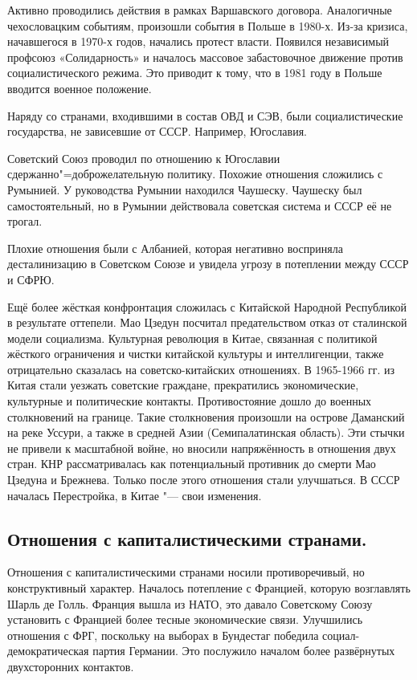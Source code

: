     Активно проводились действия в рамках Варшавского договора. Аналогичные чехословацким событиям, произошли события в Польше в 1980-х. Из-за кризиса, начавшегося в 1970-х годов, начались протест власти. Появился независимый профсоюз «Солидарность» и началось массовое забастовочное движение против социалистического режима. Это приводит к тому, что в 1981 году в Польше вводится военное положение.

    Наряду со странами, входившими в состав ОВД и СЭВ, были социалистические государства, не зависевшие от СССР. Например, Югославия.

    Советский Союз проводил по отношению к Югославии сдержанно"=доброжелательную политику. Похожие отношения сложились с Румынией. У руководства Румынии находился Чаушеску. Чаушеску был самостоятельный, но в Румынии действовала советская система и СССР её не трогал.
    
    Плохие отношения были с Албанией, которая негативно восприняла десталинизацию в Советском Союзе и увидела угрозу в потеплении между СССР и СФРЮ.
    
    Ещё более жёсткая конфронтация сложилась с Китайской Народной Республикой в результате оттепели. Мао Цзедун посчитал предательством отказ от сталинской модели социализма. Культурная революция в Китае, связанная с политикой жёсткого ограничения и чистки китайской культуры и интеллигенции, также отрицательно сказалась на советско-китайских отношениях. В 1965-1966 гг. из Китая стали уезжать советские граждане, прекратились экономические, культурные и политические контакты. Противостояние дошло до военных столкновений на границе. Такие столкновения произошли на острове Даманский на реке Уссури, а также в средней Азии (Семипалатинская область). Эти стычки не привели к масштабной войне, но вносили напряжённость в отношения двух стран. КНР рассматривалась как потенциальный противник до смерти Мао Цзедуна и Брежнева. Только после этого отношения стали улучшаться. В СССР началась Перестройка, в Китае "--- свои изменения.

    \subsection{Отношения с капиталистическими странами.}
    
    Отношения с капиталистическими странами носили противоречивый, но конструктивный характер. Началось потепление с Францией, которую возглавлять Шарль де Голль. Франция вышла из НАТО, это давало Советскому Союзу установить с Францией более тесные экономические связи. Улучшились отношения с ФРГ, поскольку на выборах в Бундестаг победила социал-демократическая партия Германии. Это послужило началом более развёрнутых двухсторонних контактов.
    

